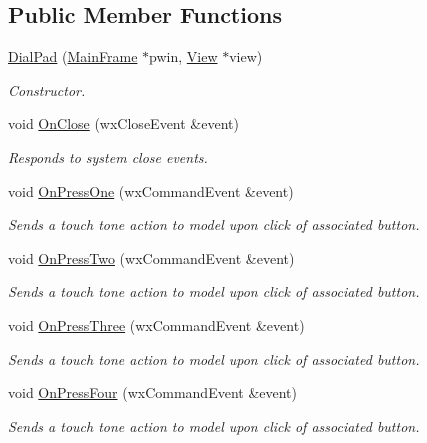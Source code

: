 \subsection*{Public Member Functions}
\begin{CompactItemize}
\item 
\hyperlink{classDialPad_4f25385be59567e595bad984693ec01f}{DialPad} (\hyperlink{classMainFrame}{MainFrame} $\ast$pwin, \hyperlink{classView}{View} $\ast$view)
\begin{CompactList}\small\item\em Constructor. \item\end{CompactList}\item 
void \hyperlink{classDialPad_d3bc3a3c043049ef4d396768dfade82f}{OnClose} (wxCloseEvent \&event)
\begin{CompactList}\small\item\em Responds to system close events. \item\end{CompactList}\item 
void \hyperlink{classDialPad_5b55819a3a90ff5abf9e1c6f7c36126c}{OnPressOne} (wxCommandEvent \&event)
\begin{CompactList}\small\item\em Sends a touch tone action to model upon click of associated button. \item\end{CompactList}\item 
void \hyperlink{classDialPad_dbf2a305725f08af6237df2c50eb92b6}{OnPressTwo} (wxCommandEvent \&event)
\begin{CompactList}\small\item\em Sends a touch tone action to model upon click of associated button. \item\end{CompactList}\item 
void \hyperlink{classDialPad_32214f7d206c448a7f25ceabaa32bdcb}{OnPressThree} (wxCommandEvent \&event)
\begin{CompactList}\small\item\em Sends a touch tone action to model upon click of associated button. \item\end{CompactList}\item 
void \hyperlink{classDialPad_3ba175a7000657d2a79ccbb858b5803f}{OnPressFour} (wxCommandEvent \&event)
\begin{CompactList}\small\item\em Sends a touch tone action to model upon click of associated button. \item\end{CompactList}\item 

\end{CompactItemize}

